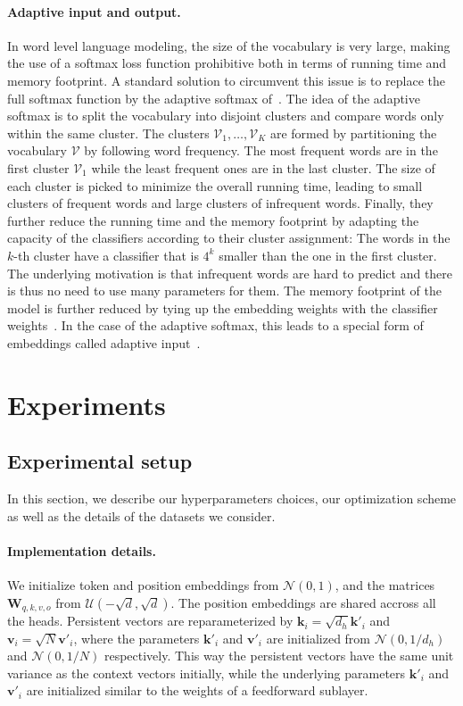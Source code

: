 \documentclass{article}
\begin{document}
\paragraph{Adaptive input and output.}
In word level language modeling, the size of the vocabulary is very large, making the use of a softmax loss function prohibitive both in terms of running time and memory footprint.
A standard solution to circumvent this issue is to replace the full softmax function by the adaptive softmax of~\citet{grave2017efficient}.
The idea of the adaptive softmax is to split the vocabulary into disjoint clusters and compare words only within the same cluster.
The clusters $\mathcal{V}_1,\dots,\mathcal{V}_K$ are formed by partitioning the vocabulary $\mathcal{V}$ by following word frequency.
The most frequent words are in the first cluster $\mathcal{V}_1$ while the least frequent ones are in the last cluster.
The size of each cluster is picked to minimize the overall running time, leading to small clusters of frequent words and large clusters of infrequent words.
Finally, they further reduce the running time and the memory footprint by adapting the capacity of the classifiers according to their cluster assignment:
The words in the $k$-th cluster have a classifier that is  $4^k$ smaller than the one in the first cluster.
The underlying motivation is that infrequent words are hard to predict and there is thus no need to use many parameters for them.
The memory footprint of the model is further reduced by tying up the embedding weights with the classifier weights~\cite{inan2016tying,press2016using}.
In the case of the adaptive softmax, this leads to a special form of embeddings called adaptive input~\cite{baevski2018adaptive}.
 
\section{Experiments}
\label{sec:experiments}

\subsection{Experimental setup}

In this section, we describe our hyperparameters choices, our optimization scheme as well as the details of the datasets we consider.

\paragraph{Implementation details.}
We initialize token and position embeddings from $\mathcal{N}(0,1)$, and the matrices $\mathbf{W}_{q,k,v,o}$ from $\mathcal{U}(-\sqrt{d}, \sqrt{d})$. The position embeddings are shared accross all the heads.
Persistent vectors are reparameterized by $\mathbf{k}_i = \sqrt{d_h} \mathbf{k}'_i$ and $\mathbf{v}_i = \sqrt{N} \mathbf{v}'_i$, where the parameters $\mathbf{k}'_i$ and $\mathbf{v}'_i$ are initialized from $\mathcal{N}(0, 1/d_h)$ and $\mathcal{N}(0, 1/N)$ respectively. This way the persistent vectors have the same unit variance as the context vectors initially, while the underlying parameters $\mathbf{k}'_i$ and $\mathbf{v}'_i$ are initialized similar to the weights of a feedforward sublayer.
\end{document}
